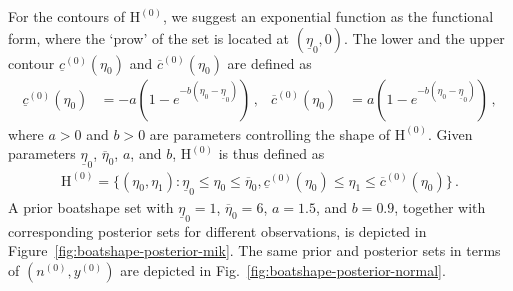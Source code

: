 \documentclass[runningheads,a4paper]{llncs}
\newcommand{\uz}{^{(0)}} %
\newcommand{\ul}[1]{\underline{#1}}
\newcommand{\ol}[1]{\overline{#1}}
\def\yz{y\uz}
\def\nz{n\uz}
\def\EZ{\mathrm{H}\uz}
\def\ezl{\ul{\eta}_0}
\def\ezu{\ol{\eta}_0}
\def\czl{\ul{c}\uz}
\def\czu{\ol{c}\uz}
\begin{document}
For the contours of $\EZ$, we suggest an exponential function as the functional form,
where the `prow' of the set is located at $(\ezl, 0)$.
The lower and the upper contour $\czl(\eta_0)$ and $\czu(\eta_0)$ are defined as
\begin{align}
\czl(\eta_0) &= -a \left( 1 - e^{-b(\eta_0 - \ezl)} \right)\,, &
\czu(\eta_0) &=  a \left( 1 - e^{-b(\eta_0 - \ezl)} \right)\,, 
\label{eq:basiccontours}
\end{align}
where $a > 0$ and $b > 0$ are parameters controlling the shape of $\EZ$.
Given parameters $\ezl$, $\ezu$, $a$, and $b$, $\EZ$ is thus defined as
\begin{align}
\label{eq:basicset}
\EZ =
\{(\eta_0,\eta_1) \colon \ezl \le \eta_0 \le \ezu, \czl(\eta_0) \le  \eta_1 \le \czu(\eta_0) \}\,.
\end{align}
A prior boatshape set with $\ezl=1$, $\ezu=6$, $a=1.5$, and $b=0.9$,
together with corresponding posterior sets for different observations,
is depicted in Figure~\ref{fig:boatshape-posterior-mik}.
The same prior and posterior sets in terms of $(\nz, \yz)$ are depicted in Fig.~\ref{fig:boatshape-posterior-normal}.
\end{document}
